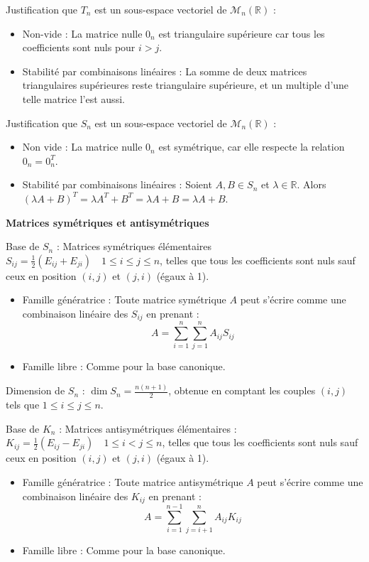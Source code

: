 \documentclass[10pt,a4paper]{article}
\begin{document}
\q Justification que $T_n$ est un sous-espace vectoriel de $\mathcal{M}_n(\mathbb{R})$ :
\begin{itemize}
    \item Non-vide : La matrice nulle $0_n$ est triangulaire supérieure car tous les coefficients
    sont nuls pour $i > j$.
    \item Stabilité par combinaisons linéaires : La somme de deux matrices triangulaires supérieures reste triangulaire supérieure,
    et un multiple d'une telle matrice l'est aussi.
\end{itemize}

Justification que $S_n$ est un sous-espace vectoriel de $\mathcal{M}_n(\mathbb{R})$ :
\begin{itemize}
    \item Non vide : La matrice nulle $0_n$ est symétrique, car elle respecte la relation $0_n =
    0_n^T$.
    \item Stabilité par combinaisons linéaires : Soient $A, B \in S_n$ et $\lambda \in \mathbb{R}$.
    Alors $(\lambda A + B)^T = \lambda A^T + B^T = \lambda A + B = \lambda A + B$.
\end{itemize}

\bigskip
\textbf{Matrices symétriques et antisymétriques}

\q Base de $S_n$ : Matrices symétriques élémentaires $S_{ij} = \frac{1}{2} (E_{ij} + E_{ji}) \quad 1
\leq i \leq j \leq n$, telles que tous les coefficients sont nuls sauf ceux en position $(i,j)$ et
$(j,i)$ (égaux à 1).
\begin{itemize}
    \item Famille génératrice : Toute matrice symétrique $A$ peut s'écrire comme une combinaison
    linéaire des $S_{ij}$ en prenant : $$A = \sum_{i=1}^n \sum_{j=1}^n A_{ij} S_{ij}$$
    \item Famille libre : Comme pour la base canonique.
\end{itemize}

Dimension de $S_n$ : $ \dim S_n = \frac{n(n+1)}{2}$, obtenue en comptant les couples $(i,j)$ tels que
$1 \leq i \leq j \leq n$.

\bigskip
Base de $K_n$ : Matrices antisymétriques élémentaires : $K_{ij} = \frac{1}{2} (E_{ij} - E_{ji}) \quad 1
\leq i < j \leq n$, telles que tous les coefficients sont nuls sauf ceux en position $(i,j)$ et $(j,i)$
(égaux à 1).
\begin{itemize}
    \item Famille génératrice : Toute matrice antisymétrique $A$ peut s'écrire comme une combinaison
    linéaire des $K_{ij}$ en prenant : $$A = \sum_{i=1}^{n-1} \sum_{j=i+1}^n A_{ij} K_{ij}$$
    \item Famille libre : Comme pour la base canonique.
\end{itemize}
\end{document}
